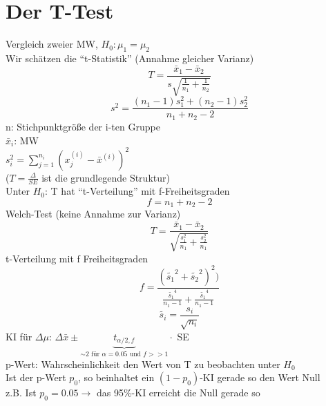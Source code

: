 \section{Der T-Test}
Vergleich zweier MW, $H_0: \mu_1 = \mu_2$ \\
Wir schätzen die ``t-Statistik'' (Annahme gleicher Varianz) \\
\[ T = \frac{\bar{x}_1 - \bar{x}_2}{s \sqrt{\frac{1}{n_1} + \frac{1}{n_2}}} \]
\[ s^2 = \frac{(n_1 - 1) s_1^2 + (n_2 -1) s_2^2}{n_1 + n_2 -2} \]
n: Stichpunktgröße der i-ten Gruppe \\
$\bar{x}_i$: MW \\
$s_i^2 = \sum\limits_{j=1}^{n_i} (x_j^{(i)} - \bar{x}^{(i)} )^2 $ \\
($T = \frac{\Delta}{SE}$ ist die grundlegende Struktur) \\
Unter $H_0$: T hat ``t-Verteilung'' mit f-Freiheitsgraden
\[ f= n_1 + n_2 -2 \]
Welch-Test (keine Annahme zur Varianz) \\
\[ T = \frac{\bar{x}_1 - \bar{x}_2 }{\sqrt{\frac{s_1^2}{n_1} + \frac{s_2^2}{n_1}}} \]
t-Verteilung mit f Freiheitsgraden
\[ f=\frac{(\tilde{s_1}^2 + \tilde{s_2}^2)^2)}{\frac{\tilde{s_1}^4}{n_1 - 1} + \frac{\tilde{s_1}^4}{n_1 - 1}} \]
\[ \tilde{s_i} = \frac{s_i}{\sqrt{n_i}} \]
KI für $\Delta \mu$: $\Delta \bar{x} \pm \underbrace{t_{\alpha / 2 , f}}_{\sim 2 \text{ für } \alpha=0.05 \text{ und } f >> 1}  \cdot$ SE \\
p-Wert: Wahrscheinlichkeit den Wert von T zu beobachten unter $H_0$ \\
Ist der p-Wert $p_0$, so beinhaltet ein $(1-p_0)$-KI gerade so den Wert Null \\
z.B. Ist $p_0=0.05 \rightarrow$ das 95\%-KI erreicht die Null gerade so

